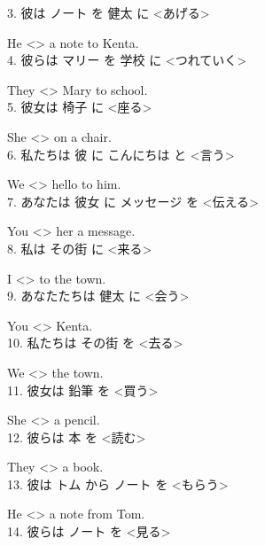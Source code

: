 \documentclass[uplatex,
paper=a4,
fontsize=18pt,
jafontsize=16pt,
number_of_lines=30,
line_length=30zh,
baselineskip=25pt,
]{jlreq}
\begin{document}
3.  彼は ノート を 健太 に <あげる>

  He <\hspace{3em}> a note to Kenta.
\\

4.  彼らは マリー を 学校 に <つれていく>

  They <\hspace{3em}> Mary to school.
\\

5.  彼女は 椅子 に <座る>

  She <\hspace{3em}> on a chair.
\\

6.  私たちは 彼 に こんにちは と <言う>

  We <\hspace{3em}> hello to him.
\\

7.  あなたは 彼女 に メッセージ を <伝える>

  You <\hspace{3em}> her a message.
\\

8.  私は その街 に <来る>

  I <\hspace{3em}> to the town.
\\

9.  あなたたちは 健太 に <会う>

  You <\hspace{3em}> Kenta.
\\

10.  私たちは その街 を <去る>

  We <\hspace{3em}> the town.
\\

11.  彼女は 鉛筆 を <買う>

  She <\hspace{3em}> a pencil.
\\

12.  彼らは 本 を <読む>

  They <\hspace{3em}> a book.
\\

13.  彼は トム から ノート を <もらう>

  He <\hspace{3em}> a note from Tom.
\\

14.  彼らは ノート を <見る>
\end{document}
